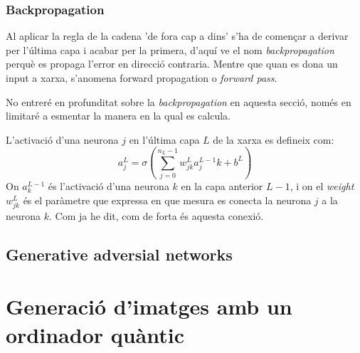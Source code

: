 \subsection{Backpropagation}
Al aplicar la regla de la cadena 'de fora cap a dins' s'ha de començar a derivar per l'última capa i acabar per la primera, d'aquí ve el nom \textit{backpropagation} perquè es propaga l'error en direcció contraria. Mentre que quan es dona un input a xarxa, s'anomena {forward propagation} o \textit{forward pass}.  

No entreré en profunditat sobre la \textit{backpropagation} en aquesta secció, només en limitaré a esmentar la manera en la qual es calcula. 

L'activació d'una neurona $j$ en l'última capa $L$ de la xarxa es defineix com: 
$$
a^{L}_j = \sigma(\sum_{j=0}^{n_L - 1}w^L_{jk} a^{L-1}_jk+ b^L)
$$
On $a^{L-1}_k$ és l'activació d'una neurona $k$ en la capa anterior $L-1$, i on el \textit{weight} $w^L_{jk}$ és el paràmetre que expressa en que mesura es conecta la neurona $j$ a la neurona $k$. Com ja he dit, com de forta és aquesta conexió.  
\section{Generative adversial networks}

\chapter{Generació d'imatges amb un ordinador quàntic}
